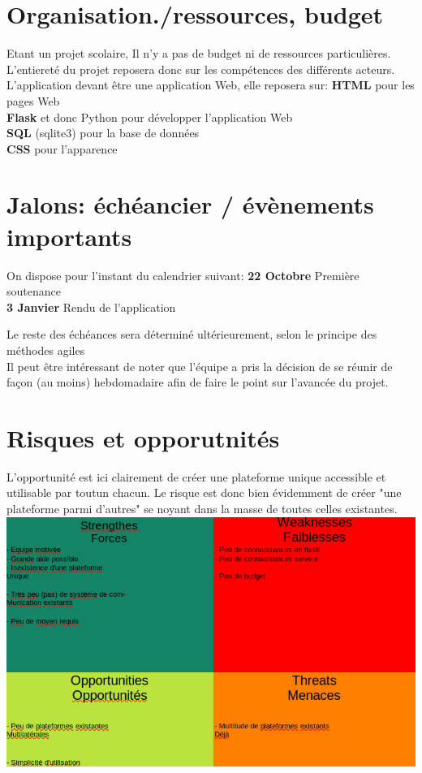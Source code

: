 \newpage

\section*{Organisation./ressources, budget}
Etant un projet scolaire, Il n'y a pas de budget ni de ressources particulières. L'entiereté du projet reposera donc sur les compétences des différents acteurs.\\
L'application devant être une application Web, elle reposera sur:
	\textbf{HTML} pour les pages Web \\
	\textbf{Flask} et donc Python pour développer l'application Web \\
	\textbf{SQL} (sqlite3) pour la base de données \\
	\textbf{CSS} pour l'apparence

\section*{Jalons: échéancier / évènements importants}
On dispose pour l'instant du calendrier suivant:
	\textbf{22 Octobre} Première soutenance \\
	\textbf{3 Janvier} Rendu de l'application

Le reste des échéances sera déterminé ultérieurement, selon le principe des méthodes agiles \\
Il peut être intéressant de noter que l'équipe a pris la décision de se réunir de façon (au moins) hebdomadaire afin de faire le point sur l'avancée du projet.


\section*{Risques et opporutnités}
L'opportunité est ici clairement de créer une plateforme unique accessible et utilisable par toutun chacun. Le risque est donc bien évidemment de créer "une plateforme parmi d'autres" se noyant dans la masse de toutes celles existantes.
\includegraphics{swot.jpg}
